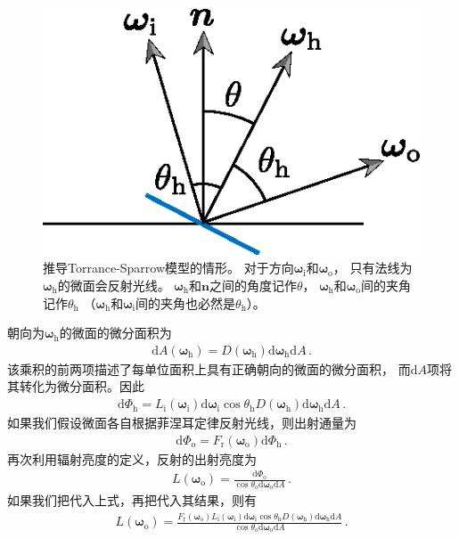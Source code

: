 \begin{figure}[htbp]
    \centering
    \includegraphics[width=0.35\linewidth]{Pictures/chap08/TorranceSparrowSetting.eps}
    \caption{推导Torrance-Sparrow模型的情形。
    对于方向${\bm\omega}_{\mathrm{i}}$和${\bm\omega}_{\mathrm{o}}$，
    只有法线为${\bm\omega}_{\mathrm{h}}$的微面会反射光线。
    ${\bm\omega}_{\mathrm{h}}$和$\bm n$之间的角度记作$\theta$，
    ${\bm\omega}_{\mathrm{h}}$和${\bm\omega}_{\mathrm{o}}$间的夹角记作$\theta_{\mathrm{h}}$
    （${\bm\omega}_{\mathrm{h}}$和${\bm\omega}_{\mathrm{i}}$间的夹角也必然是$\theta_{\mathrm{h}}$）。}
    \label{fig:8.20}
\end{figure}

朝向为${\bm\omega}_{\mathrm{h}}$的微面的微分面积为
\begin{align*}
    \mathrm{d}A({\bm\omega}_{\mathrm{h}})=D({\bm\omega}_{\mathrm{h}})\mathrm{d}{\bm\omega}_{\mathrm{h}}\mathrm{d}A\, .
\end{align*}
该乘积的前两项描述了每单位面积上具有正确朝向的微面的微分面积，
而$\mathrm{d}A$项将其转化为微分面积。因此
\begin{align}\label{eq:8.15}
    \mathrm{d}\varPhi_{\mathrm{h}}=L_{\mathrm{i}}({\bm\omega}_{\mathrm{i}})
    \mathrm{d}{\bm\omega}_{\mathrm{i}}\cos\theta_{\mathrm{h}}
    D({\bm\omega}_{\mathrm{h}})\mathrm{d}{\bm\omega}_{\mathrm{h}}\mathrm{d}A\, .
\end{align}
如果我们假设微面各自根据菲涅耳定律反射光线，则出射通量为
\begin{align}\label{eq:8.16}
    \mathrm{d}\varPhi_{\mathrm{o}}=F_{\mathrm{r}}({\bm\omega}_{\mathrm{o}})\mathrm{d}\varPhi_{\mathrm{h}}\, .
\end{align}
再次利用辐射亮度的定义，反射的出射亮度为
\begin{align*}
    L({\bm\omega}_{\mathrm{o}})=\frac{\mathrm{d}\varPhi_{\mathrm{o}}}
    {\cos\theta_{\mathrm{o}}\mathrm{d}{\bm\omega}_{\mathrm{o}}\mathrm{d}A}\, .
\end{align*}
如果我们把代入上式，再把代入其结果，则有
\begin{align*}
    L({\bm\omega}_{\mathrm{o}})=\frac{F_{\mathrm{r}}({\bm\omega}_{\mathrm{o}})
    L_{\mathrm{i}}({\bm\omega}_{\mathrm{i}})\mathrm{d}{\bm\omega}_{\mathrm{i}}\cos\theta_{\mathrm{h}}
    D({\bm\omega}_{\mathrm{h}})\mathrm{d}{\bm\omega}_{\mathrm{h}}\mathrm{d}A}
    {\cos\theta_{\mathrm{o}}\mathrm{d}{\bm\omega}_{\mathrm{o}}\mathrm{d}A}\, .
\end{align*}

